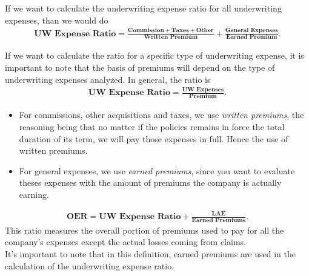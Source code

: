\documentclass[11pt, english]{memoir}
\numberwithin{definition}{section}
\begin{document}
	
	\begin{tcolorbox}[adjusted title = \textbf{Underwriting Expense Ratio}, boxrule = 0mm]
		If we want to calculate the underwriting expense ratio for all underwriting expenses, than we would do 
		\begin{align*}
		\textbf{UW Expense Ratio} = \frac{\textbf{Commission} + \textbf{Taxes} + \textbf{Other}}{\textbf{Written Premium}} + \frac{\textbf{General Expenses}}{\textbf{Earned Premium}}.
		\end{align*}
		
		If we want to calculate the ratio for a specific type of underwriting expense, it is important to note that the basis of premiums will depend on the type of underwriting expenses analyzed. In general, the ratio is
		\begin{align*}
		\textbf{UW Expense Ratio} = \frac{\textbf{UW Expenses}}{\textbf{Premium}} .
		\end{align*}
		\begin{itemize}
			\item For commissions, other acquisitions and taxes, we use \emph{written premiums}, the reasoning being that no matter if the policies remains in force the total duration of its term, we will pay those expenses in full. Hence the use of written premiums.
			\item For general expenses, we use \emph{earned premiums}, since you want to evaluate theses expenses with the amount of premiums the company is actually earning. 
		\end{itemize}
	\end{tcolorbox}
	
	
	\begin{tcolorbox}[adjusted title = \textbf{Operating Expenses Ratio (OER)}, boxrule = 0mm]
		\begin{align*}
		\textbf{OER} = \textbf{UW Expense Ratio} + \frac{\textbf{LAE}}{\textbf{Earned Premiums}} .
		\end{align*}
		This ratio measures the overall portion of premiums used to pay for all the company's expenses except the actual losses coming from claims. \\
		
		It's important to note that in this definition, earned premiums are used in the calculation of the underwriting expense ratio. 
	\end{tcolorbox}
	
\end{document}

